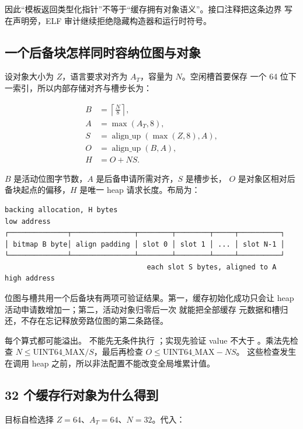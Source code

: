 因此“模板返回类型化指针”不等于“缓存拥有对象语义”。接口注释把这条边界
写在声明旁，ELF 审计继续拒绝隐藏构造器和运行时符号。

\subsection{一个后备块怎样同时容纳位图与对象}

设对象大小为 \(Z\)，语言要求对齐为 \(A_T\)，容量为 \(N\)。空闲槽首要保存
一个 64 位下一索引，所以内部存储对齐与槽步长为：

\[
\begin{aligned}
 B &= \left\lceil\frac{N}{8}\right\rceil,\\
 A &= \max(A_T,8),\\
 S &= \operatorname{align\_up}(\max(Z,8),A),\\
 O &= \operatorname{align\_up}(B,A),\\
 H &= O+N S.
\end{aligned}
\]

\(B\) 是活动位图字节数，\(A\) 是后备申请所需对齐，\(S\) 是槽步长，
\(O\) 是对象区相对后备块起点的偏移，\(H\) 是唯一 heap 请求长度。布局为：

\begin{verbatim}
backing allocation, H bytes
low address
┌──────────────┬───────────────┬────────┬────────┬─────┬──────────┐
│ bitmap B byte│ align padding │ slot 0 │ slot 1 │ ... │ slot N-1 │
└──────────────┴───────────────┴────────┴────────┴─────┴──────────┘
                                  each slot S bytes, aligned to A
high address
\end{verbatim}

位图与槽共用一个后备块有两项可验证结果。第一，缓存初始化成功只会让 heap
活动申请数增加一；第二，活动对象归零后一次  就能把全部缓存
元数据和槽归还，不存在忘记释放旁路位图的第二条路径。

每个算式都可能溢出。 不能先无条件执行
；实现先验证 value 不大于
。乘法先检查 \(N\le
\mathrm{UINT64\_MAX}/S\)，最后再检查 \(O\le\mathrm{UINT64\_MAX}-NS\)。
这些检查发生在调用 heap 之前，所以非法配置不能改变全局堆累计值。

\subsection{32 个缓存行对象为什么得到 }

目标自检选择 \(Z=64\)、\(A_T=64\)、\(N=32\)。代入：

